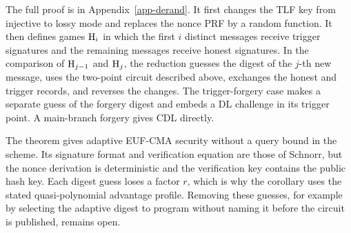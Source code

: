 The full proof is in Appendix~\ref{app-derand}. It first changes the TLF key from injective to lossy mode and replaces the nonce PRF by a random function. It then defines games $\textnormal{H}_i$ in which the first $i$ distinct messages receive trigger signatures and the remaining messages receive honest signatures. In the comparison of $\textnormal{H}_{j-1}$ and $\textnormal{H}_j$, the reduction guesses the digest of the $j$-th new message, uses the two-point circuit described above, exchanges the honest and trigger records, and reverses the changes. The trigger-forgery case makes a separate guess of the forgery digest and embeds a DL challenge in its trigger point. A main-branch forgery gives CDL directly.

The theorem gives adaptive EUF-CMA security without a query bound in the scheme. Its signature format and verification equation are those of Schnorr, but the nonce derivation is deterministic and the verification key contains the public hash key. Each digest guess loses a factor $r$, which is why the corollary uses the stated quasi-polynomial advantage profile. Removing these guesses, for example by selecting the adaptive digest to program without naming it before the circuit is published, remains open.
